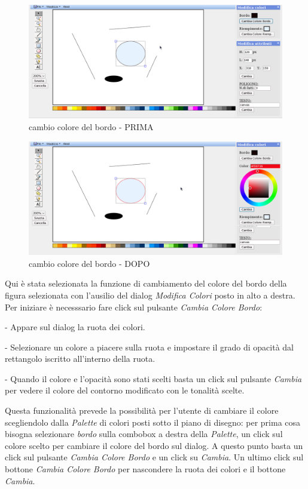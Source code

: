 \begin{figure}[!ht]
\centering
\includegraphics[scale=4]{images/colore_bordo_prima.png}
\caption{cambio colore del bordo  - PRIMA}
\end{figure} 

\begin{figure}[!ht]
\centering
\includegraphics[scale=4]{images/colore_bordo_dopo.png}
\caption{cambio colore del bordo  - DOPO}
\end{figure} 


\vspace{100pt}
Qui \`e stata selezionata la funzione di cambiamento del colore del bordo della figura selezionata con l'ausilio del dialog \textit{Modifica Colori} posto in alto a destra. Per iniziare \`e necesssario fare click sul pulsante \textit{Cambia Colore Bordo}: 
\begin{elencopuntato}[\normindent]
\item[-] Appare sul dialog la ruota dei colori.
\item[-] Selezionare un colore a piacere sulla ruota e impostare il grado di opacit\`a dal rettangolo iscritto all'interno della ruota. 
\item[-]Quando il colore e l'opacit\`a sono stati scelti basta un click sul pulsante \textit{Cambia} per vedere il colore del contorno modificato con le tonalit\`a scelte. 
\end{elencopuntato}
Questa funzionalit\`a prevede la possibilit\`a per l'utente di cambiare il colore scegliendolo dalla \textit{Palette} di colori posti sotto il piano di disegno: per prima cosa bisogna selezionare \textit{bordo} sulla combobox a destra della \textit{Palette}, un click sul colore scelto per cambiare il colore del bordo sul dialog. A questo punto basta un click sul pulsante \textit{Cambia Colore Bordo} e un click su \textit{Cambia}.
Un ultimo click sul bottone \textit{Cambia Colore Bordo} per nascondere la ruota dei colori e il bottone \textit{Cambia}.

